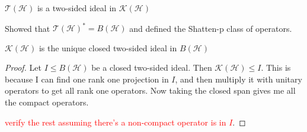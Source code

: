 

$\mathcal{T}(\mathcal{H})$ is a two-sided ideal in $\mathcal{K}(\mathcal{H})$

Showed that $\mathcal{T}(\mathcal{H})^* = B(\mathcal{H})$ and defined
the Shatten-p class of operators.

\begin{theorem}
  $\mathcal{K}(\mathcal{H})$ is the unique closed two-sided ideal in
  $B(\mathcal{H})$
\end{theorem}
\begin{proof}
  Let $I \leqslant B(\mathcal{H})$ be a closed two-sided ideal. Then
  $\mathcal{K}(\mathcal{H}) \leqslant I$. This is because I can find
  one rank one projection in $I$, and then multiply it with unitary
  operators to get all rank one operators. Now taking the closed span
  gives me all the compact operators.

  \textcolor{red}{verify the rest assuming there's a non-compact
  operator is in $I$}.
\end{proof}
